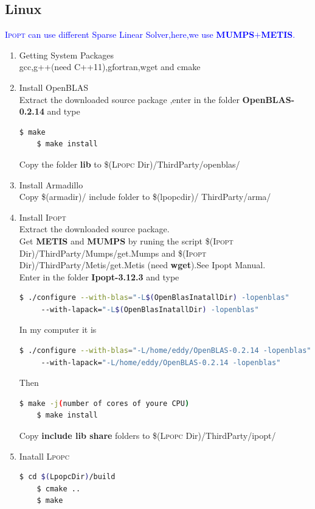\documentclass[10pt]{article}
\newcommand{\Ipopt}{\textsc{Ipopt}\xspace}
\newcommand{\LPOPC}{\textsc{Lpopc}\xspace}
\begin{document}
 \subsection{Linux}
 \textcolor{blue}{\Ipopt can use different Sparse Linear Solver,here,we use \textbf{MUMPS}$+$\textbf{METIS}.}
 \begin{enumerate}
 	\item Getting System Packages\\
 	gcc,g++(need C++11),gfortran,wget and cmake
 	\item Install OpenBLAS\\
 	Extract the downloaded source package ,enter in the folder \textbf{OpenBLAS-0.2.14} and type 
 	\begin{lstlisting}[language=sh]
 	$ make
 	$ make install
 	\end{lstlisting}
 	Copy the folder \textbf{lib} to \$(\LPOPC Dir)/ThirdParty/openblas/
 	\item Install  Armadillo\\
 		 Copy \$(armadir)/ include folder to \$(lpopcdir)/ ThirdParty/arma/
 	\item Install \Ipopt\\
 	Extract the downloaded source package.\\
 	Get \textbf{METIS} and \textbf{MUMPS} by runing the script \$(\Ipopt Dir)/ThirdParty/Mumps/get.Mumps and 
 	 \$(\Ipopt Dir)/ThirdParty/Metis/get.Metis (need \textbf {wget}).See Ipopt Manual.\\
 	Enter in the folder \textbf{Ipopt-3.12.3} and type 
 	\begin{lstlisting}[language=sh]
 	$ ./configure --with-blas="-L$(OpenBlasInatallDir) -lopenblas"
 	 --with-lapack="-L$(OpenBlasInatallDir) -lopenblas"
 	\end{lstlisting}
 	In my computer it is
 	\begin{lstlisting}[language=sh]
 	$ ./configure --with-blas="-L/home/eddy/OpenBLAS-0.2.14 -lopenblas"
 	 --with-lapack="-L/home/eddy/OpenBLAS-0.2.14 -lopenblas"
 	\end{lstlisting}
 	Then
 	\begin{lstlisting}[language=sh]
 	$ make -j(number of cores of youre CPU)
 	$ make install
 	\end{lstlisting}
 	Copy \textbf{include lib share} folders to \$(\LPOPC Dir)/ThirdParty/ipopt/
 	\item Inatall \LPOPC
 	\begin{lstlisting}[language=sh]
 	$ cd $(LpopcDir)/build
 	$ cmake ..
 	$ make 
 	\end{lstlisting}
 \end{enumerate}
 
\end{document}
